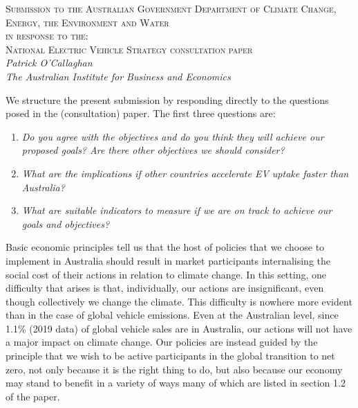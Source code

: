 \documentclass[12pt, draft]{article} \usepackage[shortlabels]{enumitem}
\begin{document}
\begin{centering}
  \textsc{Submission to the Australian Government Department of Climate Change,
  Energy, the Environment and Water\\ in response to the:\\
  National Electric Vehicle Strategy consultation paper}\\
\vskip10pt
  \emph{Patrick O'Callaghan\\
  The Australian Institute for Business and Economics}\\
\end{centering}
\vskip20pt

We structure the present submission by responding directly to the
questions posed in the (consultation) paper. The first three questions are: 

\begin{enumerate}
 
  \item \emph{Do you agree with the objectives and do you think
      they will achieve our proposed goals? Are there other objectives we
      should consider?}

  \item \emph{What are the implications if other countries accelerate EV
    uptake faster than Australia?}

  \item \emph{What are suitable indicators to measure if we are on track to
    achieve our goals and objectives?}

\end{enumerate}

Basic economic principles tell us that the host of policies that we choose to
implement in Australia should result in market participants internalising the
social cost of their actions in relation to climate change. In this setting,
one difficulty that arises is that, individually, our actions are
insignificant, even though collectively we change the climate.  This difficulty
is nowhere more evident than in the case of global vehicle emissions.  Even at
the Australian level, since 1.1\% (2019 data) of global vehicle sales are in
Australia, our actions will not have a major impact on climate change. Our
policies are instead guided by the principle that we wish to be active
participants in the global transition to net zero, not only because it is the
right thing to do, but also because our economy may stand to benefit in a
variety of ways many of which are listed in section 1.2 of the paper.
\end{document}
